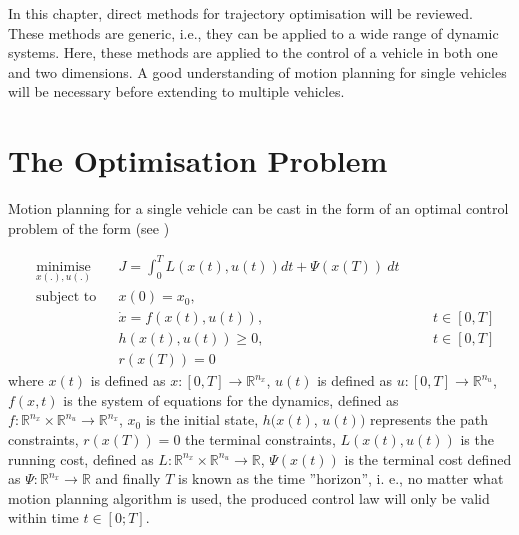 %
\cleardoublepage%
\label{chap:theory}

\par In this chapter, direct methods for trajectory optimisation will be reviewed. These methods are generic, i.e., they can be applied to a wide range of dynamic systems. Here, these methods are applied to the control of a vehicle in both one and two dimensions. A good understanding of motion planning for single vehicles will be necessary before extending to multiple vehicles.

\section{The Optimisation Problem}
\label{sec:optimprob_intro}

\par Motion planning for a single vehicle can be cast in the form of an optimal control problem of the form (see \cite{diehl2006fast})

\begin{equation}
    \begin{aligned}
    & \underset{x(.),u(.)}{\text{minimise}} && J = \int_0^T L(x(t),u(t))dt + \Psi (x(T)) \ dt\\
    & \text{subject to}  && x(0) = x_0, \\
        & && \dot{x} = f(x(t), u(t)), &&& t \in [0,T] \\ %
        & && h(x(t),u(t)) \geq 0, &&&  t \in [0,T] \\ %
        & && r(x(T)) = 0 %
    \end{aligned}
    \label{eq:general_cost}
\end{equation}
where $x(t)$ is defined as $x:[0,T]\rightarrow \mathbb{R}^{n_x}$, $u(t)$ is defined as $u:[0,T]\rightarrow \mathbb{R}^{n_u}$, $f(x,t)$ is the system of equations for the dynamics, defined as $f:\mathbb{R}^{n_x}\times \mathbb{R}^{n_u}\rightarrow \mathbb{R}^{n_x}$, $x_0$ is the initial state, $h(x(t)$, $u(t))$ represents the path constraints, $r(x(T))=0$ the terminal constraints, $L(x(t),u(t))$ is the running cost, defined as $L:\mathbb{R}^{n_x}\times \mathbb{R}^{n_u}\rightarrow \mathbb{R}$, $\Psi(x(t))$ is the terminal cost defined as $\Psi:\mathbb{R}^{n_x} \rightarrow \mathbb{R}$ and finally $T$ is known as the time ”horizon”, i. e., no matter what motion planning algorithm is used, the produced control law will only be valid within time $t\in[0;T]$.

